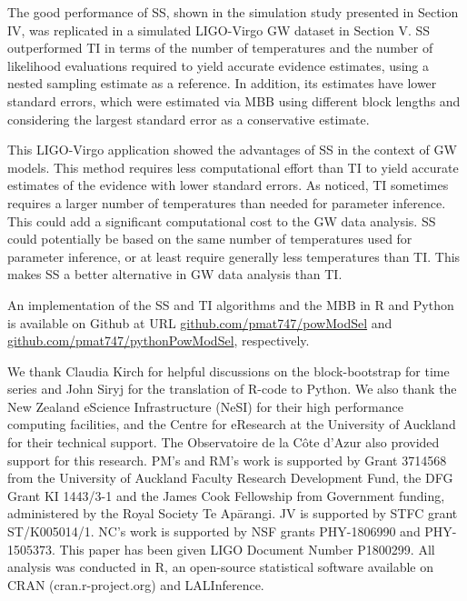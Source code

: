 \documentclass[aps,reprint,amsmath,amssymb,showpacs,showkeys]{revtex4-1}%
\newcommand{\cb}{ \color{blue}}
\begin{document}
The good performance of SS, shown in the simulation study presented in Section IV, was replicated in a simulated LIGO-Virgo GW dataset in Section V.  SS outperformed TI in terms of the number of temperatures and the number of likelihood evaluations required to yield accurate evidence estimates, using  a nested sampling estimate as a reference.  In addition, its estimates have lower standard errors, which were estimated via MBB using different block lengths and considering the largest standard error  as a conservative estimate.  

This LIGO-Virgo application showed  the advantages of SS in the context of GW models. This method requires less computational effort than TI to yield accurate estimates of the evidence with lower standard errors.  As \cite{Veitch:2015} noticed, TI sometimes requires a larger number of temperatures than  needed for parameter inference.  This could add a significant computational cost to the GW data analysis.    SS could potentially be based on the same number of temperatures used for parameter inference, or at least require generally  less temperatures than
TI.  This makes SS a better alternative in  GW data analysis than TI.

An implementation of the SS and TI algorithms and the MBB in  R and Python is available on Github at URL \href{https://github.com/pmat747/powModSel}{github.com/pmat747/powModSel} and \href{https://github.com/pmat747/pythonPowModSel}{github.com/pmat747/pythonPowModSel}, respectively.\\


\begin{acknowledgements}
  We thank Claudia Kirch for helpful discussions on the block-bootstrap for time series and John Siryj for the translation of R-code to Python.  We also thank the New Zealand eScience Infrastructure (NeSI) for their high performance computing facilities, and the Centre for eResearch at the University of Auckland for their technical support. The Observatoire de la C\^{o}te d'Azur also provided support for this research. PM's and RM's work is supported by Grant 3714568 from the University of Auckland Faculty Research Development Fund, the DFG Grant KI 1443/3-1 and the James Cook Fellowship from Government funding, administered by the Royal Society Te Ap\={a}rangi. JV is supported by STFC grant ST/K005014/1. NC's work is supported by NSF grants PHY-1806990 and PHY-1505373. This paper has been given LIGO Document Number P1800299.  All analysis was conducted in \textsf{R}, an open-source statistical software available on \textsf{CRAN} (cran.r-project.org) and LALInference.
\end{acknowledgements}






\end{document}
